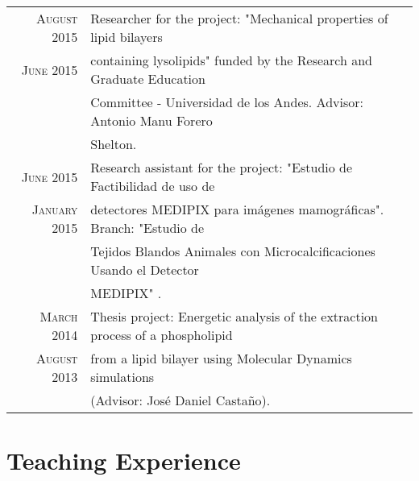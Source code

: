 \documentclass[a4paper,10pt]{article} %
\begin{document}
\begin{tabular}{rl}

\textsc{August 2015} & Researcher for the project: "Mechanical properties of lipid bilayers \\ 
\textsc{June 2015}   & containing lysolipids" funded by the Research and Graduate Education  \\ 
& Committee - Universidad de los Andes. Advisor: Antonio Manu Forero \\
& Shelton.  \\
\textsc{June 2015} & Research assistant for the project: "Estudio de Factibilidad de uso de \\ 
\textsc{January 2015} & detectores MEDIPIX para imágenes mamográficas". Branch: "Estudio de \\ 
& Tejidos Blandos Animales con Microcalciﬁcaciones Usando el Detector \\
& MEDIPIX" . \\

\textsc{March 2014} & Thesis project: Energetic analysis of the  extraction process of a phospholipid\\
\textsc{August 2013} & from a lipid bilayer using Molecular Dynamics simulations \\ & (Advisor: Jos\'e Daniel Casta\~no). 

\end{tabular}

\newpage


\color{OrangeRed}
\section{Teaching Experience}
\color{black}
\end{document}
